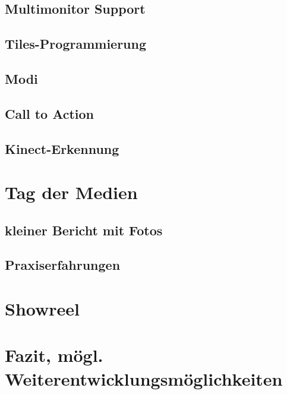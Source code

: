 \subsection{Multimonitor Support}
\subsection{Tiles-Programmierung}
\subsection{Modi}
\subsection{Call to Action}
\subsection{Kinect-Erkennung}


\section{Tag der Medien}
\subsection{kleiner Bericht mit Fotos}
\subsection{Praxiserfahrungen}

\section{Showreel}
\section{Fazit, mögl. Weiterentwicklungsmöglichkeiten}

